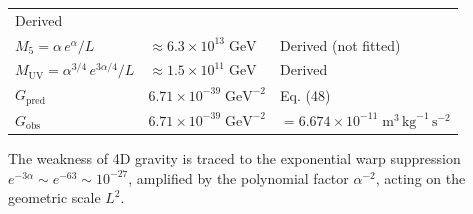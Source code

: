 \documentclass[
  11pt,
]{article}
\begin{document}
\begin{longtable}[]{@{}lll@{}}
\begin{minipage}[t]{0.30\columnwidth}
Derived\strut
\end{minipage}\tabularnewline
\begin{minipage}[t]{0.30\columnwidth}\raggedright
\(M_5 = \alpha\,e^{\alpha}/L\)\strut
\end{minipage} & \begin{minipage}[t]{0.30\columnwidth}\raggedright
\(\approx 6.3 \times 10^{13}\;\text{GeV}\)\strut
\end{minipage} & \begin{minipage}[t]{0.30\columnwidth}\raggedright
Derived (not fitted)\strut
\end{minipage}\tabularnewline
\begin{minipage}[t]{0.30\columnwidth}\raggedright
\(M_{\text{UV}} = \alpha^{3/4}\,e^{3\alpha/4}/L\)\strut
\end{minipage} & \begin{minipage}[t]{0.30\columnwidth}\raggedright
\(\approx 1.5 \times 10^{11}\;\text{GeV}\)\strut
\end{minipage} & \begin{minipage}[t]{0.30\columnwidth}\raggedright
Derived\strut
\end{minipage}\tabularnewline
\begin{minipage}[t]{0.30\columnwidth}\raggedright
\(G_{\text{pred}}\)\strut
\end{minipage} & \begin{minipage}[t]{0.30\columnwidth}\raggedright
\(6.71 \times 10^{-39}\;\text{GeV}^{-2}\)\strut
\end{minipage} & \begin{minipage}[t]{0.30\columnwidth}\raggedright
Eq. (48)\strut
\end{minipage}\tabularnewline
\begin{minipage}[t]{0.30\columnwidth}\raggedright
\(G_{\text{obs}}\)\strut
\end{minipage} & \begin{minipage}[t]{0.30\columnwidth}\raggedright
\(6.71 \times 10^{-39}\;\text{GeV}^{-2}\)\strut
\end{minipage} & \begin{minipage}[t]{0.30\columnwidth}\raggedright
\(= 6.674 \times 10^{-11}\;\text{m}^3\,\text{kg}^{-1}\,\text{s}^{-2}\)\strut
\end{minipage}\tabularnewline
\bottomrule
\end{longtable}

The weakness of 4D gravity is traced to the exponential warp suppression
\(e^{-3\alpha} \sim e^{-63} \sim 10^{-27}\), amplified by the polynomial
factor \(\alpha^{-2}\), acting on the geometric scale \(L^2\).
\end{document}
